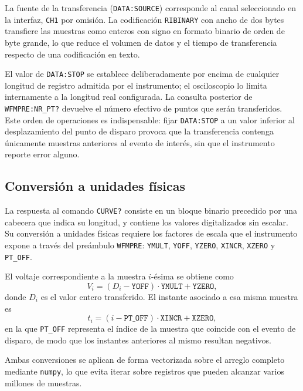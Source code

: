La fuente de la transferencia (\texttt{DATA:SOURCE}) corresponde al
canal seleccionado en la interfaz, \texttt{CH1} por omisión. La
codificación \texttt{RIBINARY} con ancho de dos bytes transfiere
las muestras como enteros con signo en formato binario de orden de
byte grande, lo que reduce el volumen de datos y el tiempo de
transferencia respecto de una codificación en texto.

El valor de \texttt{DATA:STOP} se establece deliberadamente por
encima de cualquier longitud de registro admitida por el instrumento;
el osciloscopio lo limita internamente a la longitud real
configurada. La consulta posterior de \texttt{WFMPRE:NR\_PT?} devuelve
el número efectivo de puntos que serán transferidos. Este orden de
operaciones es indispensable: fijar \texttt{DATA:STOP} a un valor
inferior al desplazamiento del punto de disparo provoca que la
transferencia contenga únicamente muestras anteriores al evento de
interés, sin que el instrumento reporte error alguno.

\subsection*{Conversión a unidades físicas}

La respuesta al comando \texttt{CURVE?} consiste en un bloque binario
precedido por una cabecera que indica su longitud, y contiene los
valores digitalizados sin escalar. Su conversión a unidades físicas
requiere los factores de escala que el instrumento expone a través
del preámbulo \texttt{WFMPRE}: \texttt{YMULT}, \texttt{YOFF},
\texttt{YZERO}, \texttt{XINCR}, \texttt{XZERO} y \texttt{PT\_OFF}.

El voltaje correspondiente a la muestra $i$-ésima se obtiene como
\begin{equation}
  V_i = \left(D_i - \texttt{YOFF}\right)\cdot \texttt{YMULT}
        + \texttt{YZERO},
  \label{eq:conv_voltaje}
\end{equation}
donde $D_i$ es el valor entero transferido. El instante asociado a esa
misma muestra es
\begin{equation}
  t_i = \left(i - \texttt{PT\_OFF}\right)\cdot \texttt{XINCR}
        + \texttt{XZERO},
  \label{eq:conv_tiempo}
\end{equation}
en la que \texttt{PT\_OFF} representa el índice de la muestra que
coincide con el evento de disparo, de modo que los instantes
anteriores al mismo resultan negativos.

Ambas conversiones se aplican de forma vectorizada sobre el arreglo
completo mediante \texttt{numpy}, lo que evita iterar sobre registros
que pueden alcanzar varios millones de muestras.

